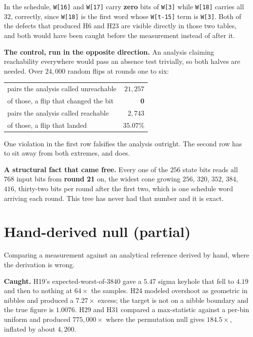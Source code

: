 In the schedule, \texttt{W[16]} and \texttt{W[17]} carry \textbf{zero} bits of \texttt{W[3]} while \texttt{W[18]} carries all \(32\), correctly, since \texttt{W[18]} is the first word whose \texttt{W[t-15]} term is \texttt{W[3]}. Both of the defects that produced H6 and H23 are visible directly in those two tables, and both would have been caught before the measurement instead of after it.

\textbf{The control, run in the opposite direction.} An analysis claiming reachability everywhere would pass an absence test trivially, so both halves are needed. Over \(24{,}000\) random flips at rounds one to six:

\begin{center}
\begin{tabular}{@{}lr@{}}
\toprule
pairs the analysis called unreachable & \(21{,}257\) \\
of those, a flip that changed the bit & \textbf{0} \\
pairs the analysis called reachable & \(2{,}743\) \\
of those, a flip that landed & \(35.07\%\) \\
\bottomrule
\end{tabular}
\end{center}

One violation in the first row falsifies the analysis outright. The second row has to sit away from both extremes, and does.

\textbf{A structural fact that came free.} Every one of the \(256\) state bits reads all \(768\) input bits from \textbf{round 21} on, the widest cone growing \(256\), \(320\), \(352\), \(384\), \(416\), thirty-two bits per round after the first two, which is one schedule word arriving each round. This tree has never had that number and it is exact.

\section{Hand-derived null (partial)}

Comparing a measurement against an analytical reference derived by hand, where the derivation is wrong.

\textbf{Caught.} H19's expected-worst-of-\(3840\) gave a \(5.47\) sigma keyhole that fell to \(4.19\) and then to nothing at \(64\times\) the samples. H24 modeled overshoot as geometric in nibbles and produced a \(7.27\times\) excess; the target is not on a nibble boundary and the true figure is \(1.0076\). H29 and H31 compared a max-statistic against a per-bin uniform and produced \(775{,}000\times\) where the permutation null gives \(184.5\times\), inflated by about \(4{,}200\).

